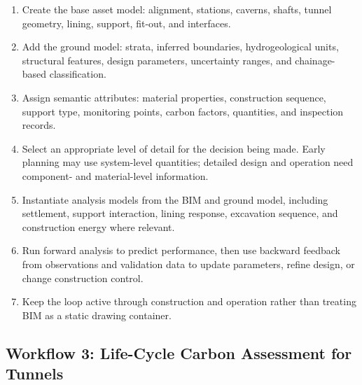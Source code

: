 \documentclass[11pt]{article}
\begin{document}
\begin{enumerate}
  \item Create the base asset model: alignment, stations, caverns, shafts,
  tunnel geometry, lining, support, fit-out, and interfaces.
  \item Add the ground model: strata, inferred boundaries, hydrogeological
  units, structural features, design parameters, uncertainty ranges, and
  chainage-based classification.
  \item Assign semantic attributes: material properties, construction sequence,
  support type, monitoring points, carbon factors, quantities, and inspection
  records.
  \item Select an appropriate level of detail for the decision being made. Early
  planning may use system-level quantities; detailed design and operation need
  component- and material-level information.
  \item Instantiate analysis models from the BIM and ground model, including
  settlement, support interaction, lining response, excavation sequence, and
  construction energy where relevant.
  \item Run forward analysis to predict performance, then use backward feedback
  from observations and validation data to update parameters, refine design, or
  change construction control.
  \item Keep the loop active through construction and operation rather than
  treating BIM as a static drawing container.
\end{enumerate}

\subsection{Workflow 3: Life-Cycle Carbon Assessment for Tunnels}
\end{document}
